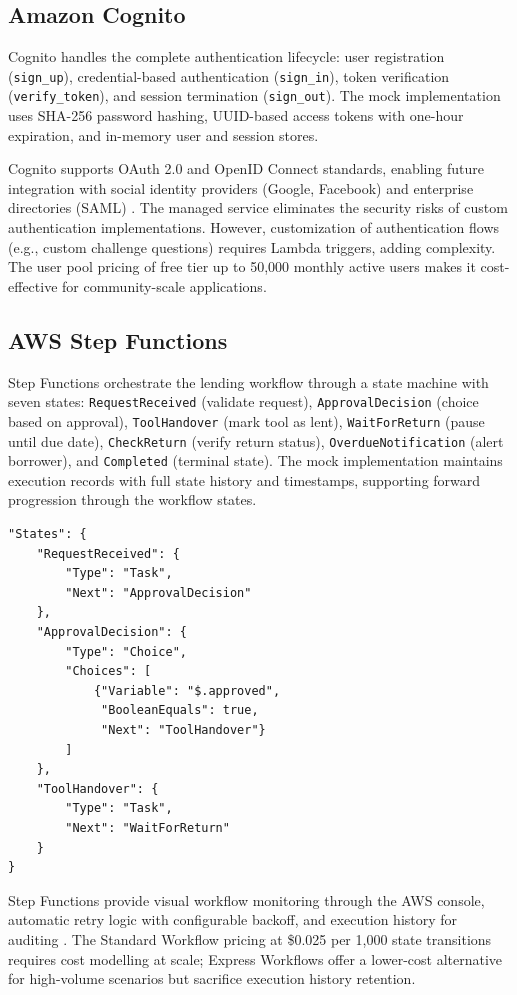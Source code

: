 \documentclass[conference]{IEEEtran}
\begin{document}
\subsection{Amazon Cognito}
Cognito handles the complete authentication lifecycle: user registration (\texttt{sign\_up}), credential-based authentication (\texttt{sign\_in}), token verification (\texttt{verify\_token}), and session termination (\texttt{sign\_out}). The mock implementation uses SHA-256 password hashing, UUID-based access tokens with one-hour expiration, and in-memory user and session stores.

Cognito supports OAuth 2.0 and OpenID Connect standards, enabling future integration with social identity providers (Google, Facebook) and enterprise directories (SAML) \cite{aws_cognito}. The managed service eliminates the security risks of custom authentication implementations. However, customization of authentication flows (e.g., custom challenge questions) requires Lambda triggers, adding complexity. The user pool pricing of free tier up to 50,000 monthly active users makes it cost-effective for community-scale applications.

\subsection{AWS Step Functions}
Step Functions orchestrate the lending workflow through a state machine with seven states: \texttt{RequestReceived} (validate request), \texttt{ApprovalDecision} (choice based on approval), \texttt{ToolHandover} (mark tool as lent), \texttt{WaitForReturn} (pause until due date), \texttt{CheckReturn} (verify return status), \texttt{OverdueNotification} (alert borrower), and \texttt{Completed} (terminal state). The mock implementation maintains execution records with full state history and timestamps, supporting forward progression through the workflow states.

\begin{lstlisting}[caption={Step Functions workflow definition}]
"States": {
    "RequestReceived": {
        "Type": "Task",
        "Next": "ApprovalDecision"
    },
    "ApprovalDecision": {
        "Type": "Choice",
        "Choices": [
            {"Variable": "$.approved",
             "BooleanEquals": true,
             "Next": "ToolHandover"}
        ]
    },
    "ToolHandover": {
        "Type": "Task",
        "Next": "WaitForReturn"
    }
}
\end{lstlisting}

Step Functions provide visual workflow monitoring through the AWS console, automatic retry logic with configurable backoff, and execution history for auditing \cite{aws_stepfunctions}. The Standard Workflow pricing at \$0.025 per 1,000 state transitions requires cost modelling at scale; Express Workflows offer a lower-cost alternative for high-volume scenarios but sacrifice execution history retention.
\end{document}
